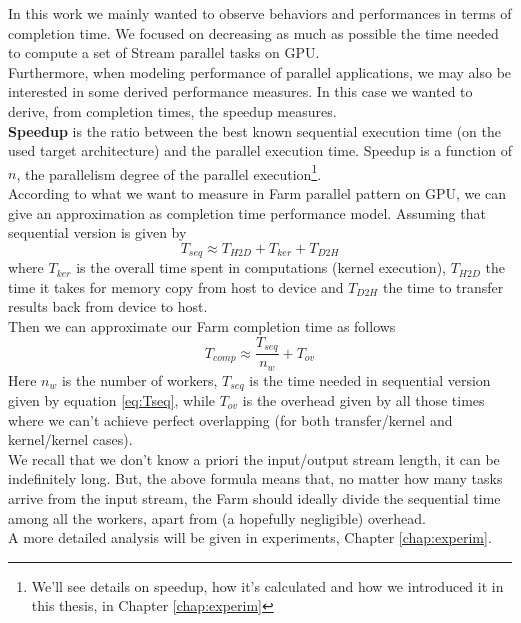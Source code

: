 	In this work we mainly wanted to observe behaviors and performances in terms of completion time. We focused on decreasing as much as possible the time needed to compute a set of Stream parallel tasks on GPU.\\
	Furthermore, when modeling performance of parallel applications, we may also be interested in some derived performance measures. In this case we wanted to derive, from completion times, the speedup measures. \\
	\textbf{Speedup} is the ratio between the best known sequential execution time (on the used target architecture) and the parallel execution time. Speedup is a function of \(n\), the parallelism degree of the parallel execution\footnote{We'll see details on speedup, how it's calculated and how we introduced it in this thesis, in Chapter \ref{chap:experim}}.\\
	According to what we want to measure in Farm parallel pattern on GPU, we can give an approximation as completion time performance model.
	Assuming that sequential version is given by
	\begin{equation}\label{eq:Tseq}
		T_{seq}\approx T_{H2D} + T_{ker} + T_{D2H}
	\end{equation}
	where \(T_{ker}\) is the overall time spent in computations (kernel execution), \(T_{H2D}\) the time it takes for memory copy from host to device and \(T_{D2H}\) the time to transfer results back from device to host.\\
	Then we can approximate our Farm completion time as follows	
	\begin{equation}\label{eq:TcompFarm}
	T_{comp} \approx  \frac{T_{seq}}{n_w} + T_{ov}
	\end{equation}
	Here \(n_w\) is the number of workers, \(T_{seq}\) is the time needed in sequential version given by equation \ref{eq:Tseq}, while \(T_{ov}\) is the overhead given by all those times where we can't achieve perfect overlapping (for both transfer/kernel and kernel/kernel cases).\\
	We recall that we don't know a priori the input/output stream length, it can be indefinitely long. But, the above formula means that, no matter how many tasks arrive from the input stream, the Farm should ideally divide the sequential time among all the workers, apart from (a hopefully negligible) overhead.\\ 
	A more detailed analysis will be given in experiments, Chapter \ref{chap:experim}.


